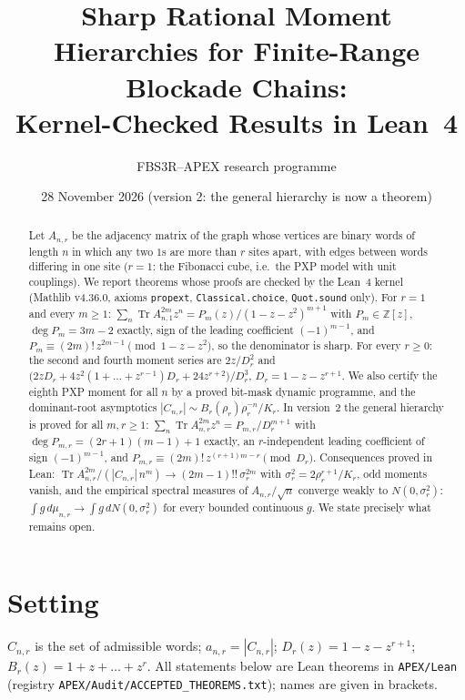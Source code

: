 \documentclass[11pt]{article}
\title{Sharp Rational Moment Hierarchies for Finite-Range Blockade Chains:\\ Kernel-Checked Results in Lean~4}
\author{FBS3R--APEX research programme}
\date{28 November 2026 (version 2: the general hierarchy is now a theorem)}
\theoremstyle{remark}\newtheorem{remark}[theorem]{Remark}
\begin{document}
\maketitle
\begin{abstract}
Let $A_{n,r}$ be the adjacency matrix of the graph whose vertices are binary words of length $n$ in which any two $1$s are more than $r$ sites apart, with edges between words differing in one site ($r=1$: the Fibonacci cube, i.e.\ the PXP model with unit couplings).
We report theorems whose proofs are checked by the Lean~4 kernel (Mathlib v4.36.0, axioms \texttt{propext}, \texttt{Classical.choice}, \texttt{Quot.sound} only).
For $r=1$ and every $m\ge1$: $\sum_n \operatorname{Tr}A_{n,1}^{2m}z^n=P_m(z)/(1-z-z^2)^{m+1}$ with $P_m\in\mathbb Z[z]$, $\deg P_m=3m-2$ exactly, sign of the leading coefficient $(-1)^{m-1}$, and $P_m\equiv(2m)!\,z^{2m-1}\pmod{1-z-z^2}$, so the denominator is sharp.
For every $r\ge0$: the second and fourth moment series are $2z/D_r^2$ and $\bigl(2zD_r+4z^2(1+\dots+z^{r-1})D_r+24z^{r+2}\bigr)/D_r^3$, $D_r=1-z-z^{r+1}$.
We also certify the eighth PXP moment for all $n$ by a proved bit-mask dynamic programme, and the dominant-root asymptotics $|C_{n,r}|\sim B_r(\rho_r)\rho_r^{-n}/K_r$.
In version~2 the general hierarchy is proved for all $m,r\ge1$: $\sum_n\operatorname{Tr}A_{n,r}^{2m}z^n=P_{m,r}/D_r^{m+1}$ with $\deg P_{m,r}=(2r+1)(m-1)+1$ exactly, an $r$-independent leading coefficient of sign $(-1)^{m-1}$, and $P_{m,r}\equiv(2m)!\,z^{(r+1)m-r}\pmod{D_r}$.
Consequences proved in Lean: $\operatorname{Tr}A_{n,r}^{2m}/(|C_{n,r}|\,n^m)\to(2m-1)!!\,\sigma_r^{2m}$ with $\sigma_r^2=2\rho_r^{r+1}/K_r$, odd moments vanish, and the empirical spectral measures of $A_{n,r}/\sqrt n$ converge weakly to $N(0,\sigma_r^2)$: $\int g\,d\mu_{n,r}\to\int g\,dN(0,\sigma_r^2)$ for every bounded continuous $g$.
We state precisely what remains open.
\end{abstract}

\section{Setting}
$C_{n,r}$ is the set of admissible words; $a_{n,r}=|C_{n,r}|$; $D_r(z)=1-z-z^{r+1}$; $B_r(z)=1+z+\dots+z^r$.
All statements below are Lean theorems in \texttt{APEX/Lean} (registry \texttt{APEX/Audit/ACCEPTED\_THEOREMS.txt}); names are given in brackets.
\end{document}
